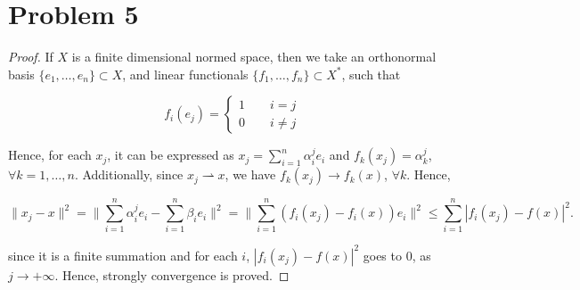 \documentclass[12pt]{article}
\begin{document}
\section*{Problem 5}

\begin{proof}

If $X$ is a finite dimensional normed space, then we take an orthonormal basis $\{e_1, \dots, e_n\} \subset X$, and linear functionals $\{f_1, \dots, f_n\} \subset X^*$, such that 

$$
f_i (e_j) = \left\{
\begin{aligned}
1 \qquad i = j \\
0 \qquad i \neq j 
\end{aligned}\right.
$$

Hence, for each $x_j$, it can be expressed as $x_j = \sum_{i=1}^n \alpha_i^j e_i$ and $f_k(x_j) = \alpha_k^j$, $\forall k = 1, \dots, n$. Additionally, since $x_j \rightharpoonup x$, we have $f_k(x_j) \rightarrow f_k(x)$, $\forall k$. Hence, 

$$
\|x_j - x\|^2 = \|\sum_{i=1}^n \alpha_i^j e_i -  \sum_{i=1}^n \beta_i e_i\|^2 = \|\sum_{i=1}^n (f_i(x_j) - f_i(x)) e_i \|^2 \leqslant \sum_{i=1}^n |f_i(x_j) - f(x)|^2.
$$

since it is a finite summation and for each $i$, $|f_i(x_j) - f(x)|^2$ goes to $0$, as $j \rightarrow +\infty$. Hence, strongly convergence is proved.

\end{proof}
\end{document}
